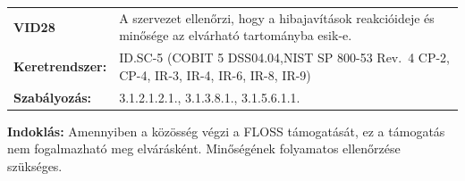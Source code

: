 \documentclass[12pt,magyar,a4paper,oneside]{scrreprt}
\begin{document}
\begin{longtable}[]{@{}ll@{}}
\toprule
\endhead
\begin{minipage}[t]{0.16\columnwidth}\raggedright
\textbf{VID28}\strut
\end{minipage} & \begin{minipage}[t]{0.79\columnwidth}\raggedright
A szervezet ellenőrzi, hogy a hibajavítások reakcióideje és minősége az
elvárható tartományba esik-e.\strut
\end{minipage}\tabularnewline
\begin{minipage}[t]{0.16\columnwidth}\raggedright
\textbf{Keretrendszer:}\strut
\end{minipage} & \begin{minipage}[t]{0.79\columnwidth}\raggedright
ID.SC-5 (COBIT 5 DSS04.04,NIST SP 800-53 Rev.~4 CP-2, CP-4, IR-3, IR-4,
IR-6, IR-8, IR-9)\strut
\end{minipage}\tabularnewline
\begin{minipage}[t]{0.16\columnwidth}\raggedright
\textbf{Szabályozás:}\strut
\end{minipage} & \begin{minipage}[t]{0.79\columnwidth}\raggedright
3.1.2.1.2.1., 3.1.3.8.1., 3.1.5.6.1.1.\strut
\end{minipage}\tabularnewline
\bottomrule
\end{longtable}

\textbf{Indoklás: } Amennyiben a közösség végzi a FLOSS támogatását, ez
a támogatás nem fogalmazható meg elvárásként. Minőségének folyamatos
ellenőrzése szükséges.
\end{document}

